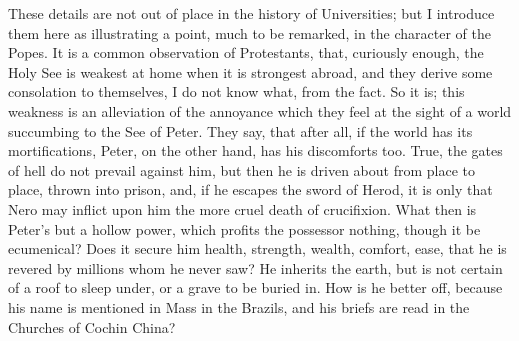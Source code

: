 These details are not out of place in the history of Universities;
but I introduce them here as illustrating a point, much to be
remarked, in the character of the Popes. It is a common observation of
Protestants, that, curiously enough, the Holy See is weakest at home
when it is strongest abroad, and they derive some consolation to
themselves, I do not know what, from the fact. So it is; this weakness
is an alleviation of the annoyance which they feel at the sight of a
world succumbing to the See of Peter. They say, that after all,
if the world has its mortifications, Peter, on the other hand, has his
discomforts too. True, the gates of hell do not prevail against him,
but then he is driven about from place to place, thrown into prison,
and, if he escapes the sword of Herod, it is only that Nero may
inflict upon him the more cruel death of crucifixion. What then is
Peter's but a hollow power, which profits the possessor nothing,
though it be ecumenical? Does it secure him health, strength, wealth,
comfort, ease, that he is revered by millions whom he never saw? He
inherits the earth, but is not certain of a roof to sleep under, or a
grave to be buried in. How is he better off, because his name is
mentioned in Mass in the Brazils, and his briefs are read in the
Churches of Cochin China?

